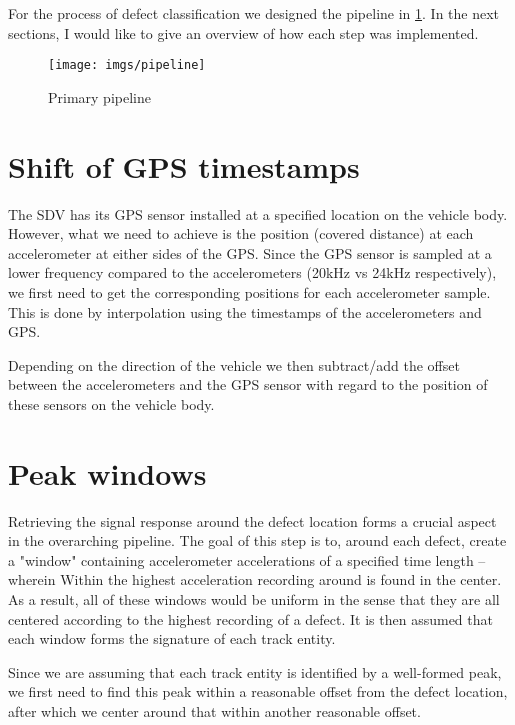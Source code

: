 For the process of defect classification we designed the pipeline in \ref{fig:pipeline}. In the next sections, I would like to give an overview of how each step was implemented.
\begin{figure}[H]
	\centering
	\texttt{[image: imgs/pipeline]}
	\caption{Primary pipeline}
	\label{fig:pipeline}
\end{figure}




\section{Shift of GPS timestamps}
The SDV has its GPS sensor installed at a specified location on the vehicle body. However, what we need to achieve is the position (covered distance) at each accelerometer at either sides of the GPS. Since the GPS sensor is sampled at a lower frequency compared to the accelerometers (20kHz vs 24kHz respectively), we first need to get the corresponding positions for each accelerometer sample. This is done by interpolation using the timestamps of the accelerometers and GPS. 

Depending on the direction of the vehicle we then subtract/add the offset between the accelerometers and the GPS sensor with regard to the position of these sensors on the vehicle body.


\section{Peak windows}
Retrieving the signal response around the defect location forms a crucial aspect in the overarching pipeline. The goal of this step is to, around each defect, create a "window" containing accelerometer accelerations of a specified time length -- wherein Within the highest acceleration recording around is found in the center. As a result, all of these windows would be uniform in the sense that they are all centered according to the highest recording of a defect. It is then assumed that each window forms the signature of each track entity. 

Since we are assuming that each track entity is identified by a well-formed peak, we first need to find this peak within a reasonable offset from the defect location, after which we center around that within another reasonable offset. 

